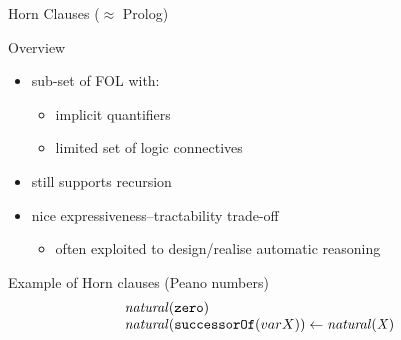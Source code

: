 \documentclass[presentation]{beamer}\mode<presentation>{\usetheme{AMSBolognaFC}}
\begin{document}
\begin{frame}[allowframebreaks]{Horn Clauses ($\approx$ Prolog)}
    \begin{block}{Overview}
        \begin{itemize}
            \item sub-set of FOL with:
            \begin{itemize}
                \item implicit quantifiers
                \item limited set of logic connectives
            \end{itemize}
    
            \bigskip
    
            \item still supports recursion
    
            \bigskip
    
            \item nice expressiveness--tractability trade-off
            \begin{itemize}
                \item often exploited to design/realise automatic reasoning
            \end{itemize}
        \end{itemize}
    \end{block}

    \framebreak
    
    \begin{exampleblock}{Example of Horn clauses (Peano numbers)}
        \begin{equation*}
            \begin{array}{l}
                \mathit{natural}(\mathtt{zero})
                \\
                \mathit{natural}(\mathtt{successorOf}(var{X})) \leftarrow \mathit{natural}(\mathit{X})
            \end{array}    
        \end{equation*}
    \end{exampleblock}
\end{frame}
\end{document}
